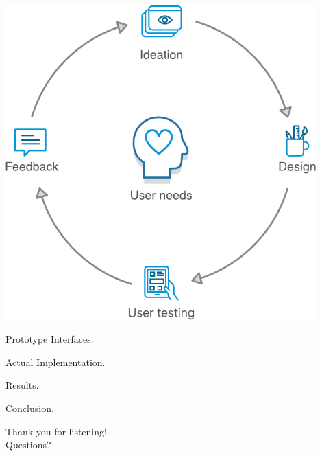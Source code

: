 \documentclass[xcolor=svgnames,10pt,aspectratio=1610]{beamer}
\begin{document}
\begin{frame}
\begin{minipage}{.49\textwidth}
\begin{minipage}{\textwidth}
\begin{minipage}{0.49\textwidth}
      \end{minipage}
      \begin{minipage}{0.49\textwidth}
        \centering
        \includegraphics[width=0.9\textwidth]{img/user_centric.pdf}
      \end{minipage}
    \end{minipage}
  \end{minipage}
\end{frame}

\begin{frame}
  \begin{center}
    Prototype Interfaces.
  \end{center}
\end{frame}

\begin{frame}
  \begin{center}
    Actual Implementation.
  \end{center}
\end{frame}

\begin{frame}
  \begin{center}
    Results.
  \end{center}
\end{frame}

\begin{frame}
  \begin{center}
    Conclusion.
  \end{center}
\end{frame}

\begin{frame}
  \begin{center}
    {\huge
    Thank you for listening! \\
    \vspace{1cm}
    Questions?
    }
  \end{center}
\end{frame}
\end{document}
